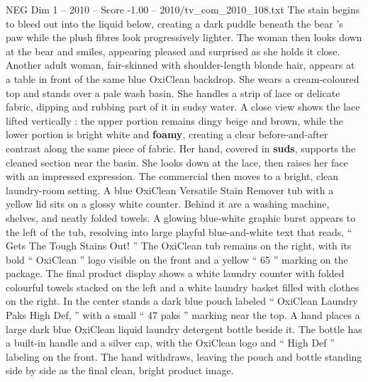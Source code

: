 \begin{textsample}{NEG Dim 1 – 2010 – Score -1.00 – 2010/tv\_com\_2010\_108.txt}
The stain begins to bleed out into the liquid below, creating a dark puddle beneath the bear ’s paw while the plush fibres look progressively lighter.
The woman then looks down at the bear and smiles, appearing pleased and surprised as she holds it close.
Another adult woman, fair-skinned with shoulder-length blonde hair, appears at a table in front of the same blue OxiClean backdrop.
She wears a cream-coloured top and stands over a pale wash basin.
She handles a strip of lace or delicate fabric, dipping and rubbing part of it in sudsy water.
A close view shows the lace lifted vertically : the upper portion remains dingy beige and brown, while the lower portion is bright white and \textbf{foamy}, creating a clear before-and-after contrast along the same piece of fabric.
Her hand, covered in \textbf{suds}, supports the cleaned section near the basin.
She looks down at the lace, then raises her face with an impressed expression.
The commercial then moves to a bright, clean laundry-room setting.
A blue OxiClean Versatile Stain Remover tub with a yellow lid sits on a glossy white counter.
Behind it are a washing machine, shelves, and neatly folded towels.
A glowing blue-white graphic burst appears to the left of the tub, resolving into large playful blue-and-white text that reads, “ Gets The Tough Stains Out! ” The OxiClean tub remains on the right, with its bold “ OxiClean ” logo visible on the front and a yellow “ 65 ” marking on the package.
The final product display shows a white laundry counter with folded colourful towels stacked on the left and a white laundry basket filled with clothes on the right.
In the center stands a dark blue pouch labeled “ OxiClean Laundry Paks High Def, ” with a small “ 47 paks ” marking near the top.
A hand places a large dark blue OxiClean liquid laundry detergent bottle beside it.
The bottle has a built-in handle and a silver cap, with the OxiClean logo and “ High Def ” labeling on the front.
The hand withdraws, leaving the pouch and bottle standing side by side as the final clean, bright product image.

\end{textsample}
